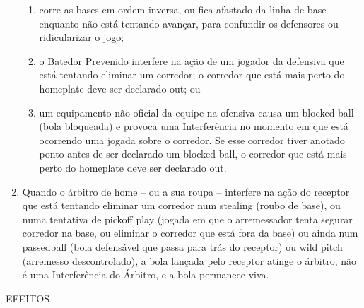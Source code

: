 \begin{enumerate}[label=(\alph*)]
\begin{enumerate}[label=\roman*.]
		\item corre as bases em ordem inversa, ou fica afastado da linha de base enquanto não está tentando avançar, para confundir os
		defensores ou ridicularizar o jogo;
		\item o Batedor Prevenido interfere na ação de um jogador da defensiva que
		está tentando eliminar um corredor; o corredor que está mais perto do \gls{homeplate} deve ser declarado \gls{out}; ou
		\item um equipamento não oficial da equipe na ofensiva causa um \gls{blocked ball} (bola bloqueada) e provoca uma Interferência no momento em que está ocorrendo uma jogada sobre o corredor. Se esse corredor tiver anotado ponto antes de ser declarado um \gls{blocked ball}, o corredor que está mais perto do \gls{homeplate} deve ser declarado \gls{out}.
	\end{enumerate}
	\item  Quando o árbitro de \gls{home} -- ou a sua roupa -- interfere na ação do receptor que está tentando eliminar um corredor num \gls{stealing} (roubo de base),  ou numa tentativa de \gls{pickoff play} (jogada em que o arremessador tenta segurar  corredor na base, ou eliminar o corredor que está fora da base) ou ainda num \gls{passedball} (bola defensável que passa para trás do receptor) ou \gls{wild pitch}  (arremesso descontrolado), a bola lançada pelo receptor atinge o árbitro, não é  uma Interferência do Árbitro, e a bola permanece viva.
\end{enumerate}

EFEITOS

